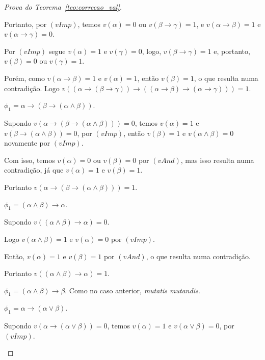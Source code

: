 \begin{proof}[Prova do Teorema~\ref{teo:correcao_val}]
\begin{provaporcasos}
\begin{provaporsubcasos}
                        Portanto, por $(vImp)$, temos $v(\alpha) = 0$ ou $v(\beta \to \gamma) = 1$, e $v(\alpha \to \beta) = 1$ e $v(\alpha \to \gamma) = 0$. 
                        
                        Por $(vImp)$ segue $v(\alpha) = 1$ e $v(\gamma) = 0$, logo, $v(\beta \to \gamma) = 1$ e, portanto, $v(\beta) = 0$ ou $v(\gamma) = 1$. 
                        
                        Porém, como $v(\alpha \to \beta) = 1$ e $v(\alpha) = 1$, então $v(\beta) = 1$, o que resulta numa contradição. Logo $v((\alpha \to (\beta \to \gamma)) \to ((\alpha \to \beta) \to (\alpha \to \gamma))) = 1$.
    
                    \subcasodeprova{} $\phi_{1} = \alpha \to (\beta \to (\alpha \land \beta))$. 
    
                        Supondo $v(\alpha \to (\beta \to (\alpha \land \beta))) = 0$, temos $v(\alpha) = 1$ e $v(\beta \to (\alpha \land \beta)) = 0$, por $(vImp)$, então $v(\beta) = 1$ e $v(\alpha \land \beta) = 0$ novamente por $(vImp)$. 
                        
                        Com isso, temos $v(\alpha) = 0$ ou $v(\beta) = 0$ por $(vAnd)$, mas isso resulta numa contradição, já que $v(\alpha) = 1$ e $v(\beta) = 1$. 
                        
                        Portanto $v(\alpha \to (\beta \to (\alpha \land \beta))) = 1$.
    
                    \subcasodeprova{} $\phi_{1} = (\alpha \land \beta) \to \alpha$. 
                    
                        Supondo $v((\alpha \land \beta) \to \alpha) = 0$. 
                    
                        Logo $v(\alpha \land \beta) = 1$ e $v(\alpha) = 0$ por $(vImp)$. 
                        
                        Então, $v(\alpha) = 1$ e $v(\beta) = 1$ por $(vAnd)$, o que resulta numa contradição. 
                        
                        Portanto $v((\alpha \land \beta) \to \alpha) = 1$.
    
                    \subcasodeprova{} $\phi_{1} = (\alpha \land \beta) \to \beta$. Como no caso anterior, \textit{mutatis mutandis}.
    
                    \subcasodeprova{} $\phi_{1} = \alpha \to (\alpha \lor \beta)$. 
                    
                        Supondo $v(\alpha \to (\alpha \lor \beta)) = 0$, temos $v(\alpha) = 1$ e $v(\alpha \lor \beta) = 0$, por $(vImp)$. 
                        

\end{provaporsubcasos}
\end{provaporcasos}
\end{proof}
